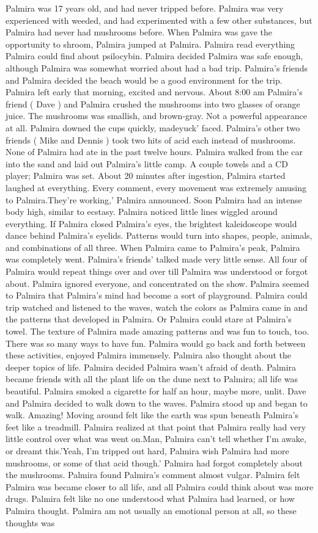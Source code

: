 \documentclass[12pt]{book}
\begin{document}
Palmira was 17 years old, and had never tripped before. Palmira was very experienced with weeded, and had experimented with a few other substances, but Palmira had never had mushrooms before. When Palmira was gave the opportunity to shroom, Palmira jumped at Palmira. Palmira read everything Palmira could find about psilocybin. Palmira decided Palmira was safe enough, although Palmira was somewhat worried about had a bad trip. Palmira's friends and Palmira decided the beach would be a good environment for the trip. Palmira left early that morning, excited and nervous. About 8:00 am Palmira's friend ( Dave ) and Palmira crushed the mushrooms into two glasses of orange juice. The mushrooms was smallish, and brown-gray. Not a powerful appearance at all. Palmira downed the cups quickly, madeyuck' faced. Palmira's other two friends ( Mike and Dennis ) took two hits of acid each instead of mushrooms. None of Palmira had ate in the past twelve hours. Palmira walked from the car into the sand and laid out Palmira's little camp. A couple towels and a CD player; Palmira was set. About 20 minutes after ingestion, Palmira started laughed at everything. Every comment, every movement was extremely amusing to Palmira.They're working,' Palmira announced. Soon Palmira had an intense body high, similar to ecstasy. Palmira noticed little lines wiggled around everything. If Palmira closed Palmira's eyes, the brightest kaleidoscope would dance behind Palmira's eyelids. Patterns would turn into shapes, people, animals, and combinations of all three. When Palmira came to Palmira's peak, Palmira was completely went. Palmira's friends' talked made very little sense. All four of Palmira would repeat things over and over till Palmira was understood or forgot about. Palmira ignored everyone, and concentrated on the show. Palmira seemed to Palmira that Palmira's mind had become a sort of playground. Palmira could trip watched and listened to the waves, watch the colors as Palmira came in and the patterns that developed in Palmira. Or Palmira could stare at Palmira's towel. The texture of Palmira made amazing patterns and was fun to touch, too. There was so many ways to have fun. Palmira would go back and forth between these activities, enjoyed Palmira immensely. Palmira also thought about the deeper topics of life. Palmira decided Palmira wasn't afraid of death. Palmira became friends with all the plant life on the dune next to Palmira; all life was beautiful. Palmira smoked a cigarette for half an hour, maybe more, unlit. Dave and Palmira decided to walk down to the waves. Palmira stood up and began to walk. Amazing! Moving around felt like the earth was spun beneath Palmira's feet like a treadmill. Palmira realized at that point that Palmira really had very little control over what was went on.Man, Palmira can't tell whether I'm awake, or dreamt this.'Yeah, I'm tripped out hard, Palmira wish Palmira had more mushrooms, or some of that acid though.' Palmira had forgot completely about the mushrooms. Palmira found Palmira's comment almost vulgar. Palmira felt Palmira was became closer to all life, and all Palmira could think about was more drugs. Palmira felt like no one understood what Palmira had learned, or how Palmira thought. Palmira am not usually an emotional person at all, so these thoughts was 
\end{document}
